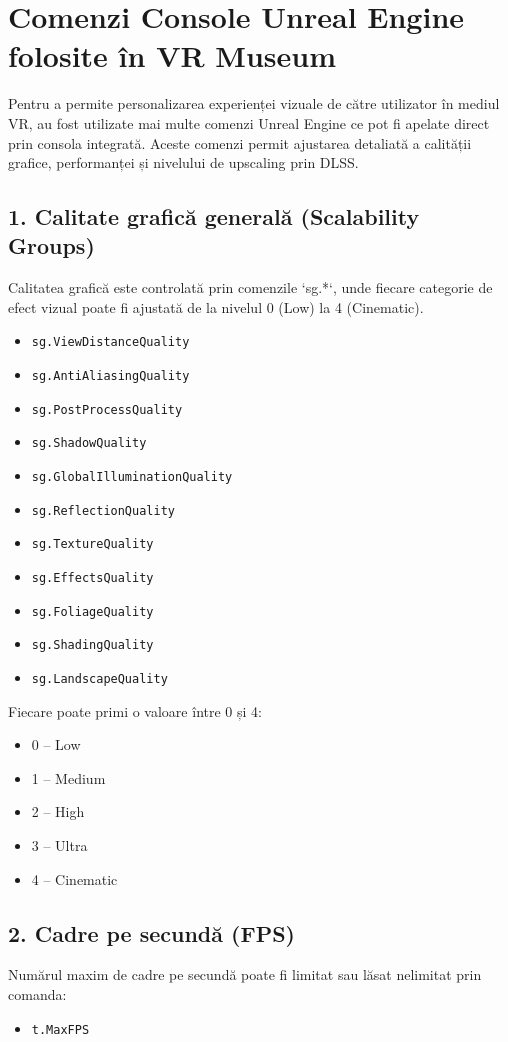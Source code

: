 \newpage
\section{Comenzi Console Unreal Engine folosite în VR Museum}
\label{anexa:comenzi_console}

Pentru a permite personalizarea experienței vizuale de către utilizator în mediul VR, au fost utilizate mai multe comenzi Unreal Engine ce pot fi apelate direct prin consola integrată. Aceste comenzi permit ajustarea detaliată a calității grafice, performanței și nivelului de upscaling prin DLSS.

\subsection*{1. Calitate grafică generală (Scalability Groups)}
Calitatea grafică este controlată prin comenzile `sg.*`, unde fiecare categorie de efect vizual poate fi ajustată de la nivelul 0 (Low) la 4 (Cinematic).

\begin{itemize}
    \item \texttt{sg.ViewDistanceQuality}
    \item \texttt{sg.AntiAliasingQuality}
    \item \texttt{sg.PostProcessQuality}
    \item \texttt{sg.ShadowQuality}
    \item \texttt{sg.GlobalIlluminationQuality}
    \item \texttt{sg.ReflectionQuality}
    \item \texttt{sg.TextureQuality}
    \item \texttt{sg.EffectsQuality}
    \item \texttt{sg.FoliageQuality}
    \item \texttt{sg.ShadingQuality}
    \item \texttt{sg.LandscapeQuality}
\end{itemize}

Fiecare poate primi o valoare între 0 și 4:
\begin{itemize}
    \item 0 – Low
    \item 1 – Medium
    \item 2 – High
    \item 3 – Ultra
    \item 4 – Cinematic
\end{itemize}

\subsection*{2. Cadre pe secundă (FPS)}
Numărul maxim de cadre pe secundă poate fi limitat sau lăsat nelimitat prin comanda:
\begin{itemize}
    \item \texttt{t.MaxFPS}
\end{itemize}


